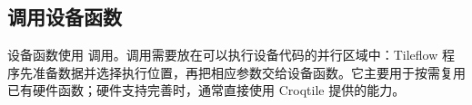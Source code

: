 \subsection*{调用设备函数}

设备函数使用 \co@call@ 调用。调用需要放在可以执行设备代码的并行区域中：Tileflow 程序先准备数据并选择执行位置，再把相应参数交给设备函数。它主要用于按需复用已有硬件函数；硬件支持完善时，通常直接使用 Croqtile 提供的能力。
